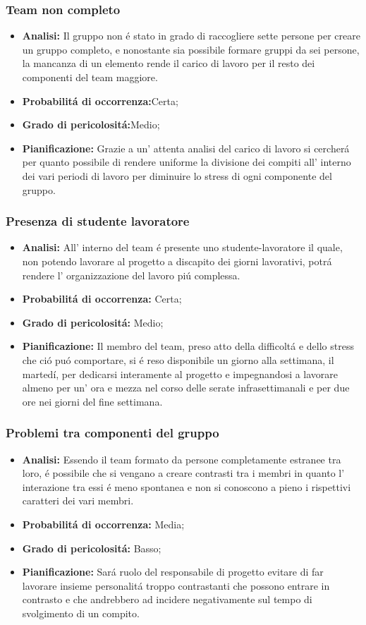 \subsubsection{Team non completo}
	\begin{itemize}
	\item \textbf{Analisi: }Il gruppo non \'e stato in grado di raccogliere sette persone per creare un gruppo completo, e nonostante sia possibile formare gruppi da sei persone, la mancanza di un elemento rende il carico di lavoro per il resto dei componenti del team maggiore.
	\item \textbf{Probabilit\'a di occorrenza:}Certa;
	\item \textbf{Grado di pericolosit\'a:}Medio;
	\item \textbf{Pianificazione: }Grazie a un' attenta analisi del carico di lavoro si cercher\'a per quanto possibile di rendere uniforme la divisione dei compiti all' interno dei vari periodi di lavoro per diminuire lo stress di ogni componente del gruppo.
	\end{itemize}
\subsubsection{Presenza di studente lavoratore}
	\begin{itemize}
	\item \textbf{Analisi: }All' interno del team \gruppo \'e presente uno studente-lavoratore il quale, non potendo lavorare al progetto a discapito dei giorni lavorativi, potr\'a rendere l' organizzazione del lavoro pi\'u complessa.
	\item \textbf{Probabilit\'a di occorrenza:} Certa;
	\item \textbf{Grado di pericolosit\'a:} Medio;
	\item \textbf{Pianificazione: }Il membro del team, preso atto della difficolt\'a e dello stress che ci\'o pu\'o comportare, si \'e reso disponibile un giorno alla settimana, il marted\'i, per dedicarsi interamente al progetto e impegnandosi a lavorare almeno per un' ora e mezza nel corso delle serate infrasettimanali e per due ore nei giorni del fine settimana.	
	\end{itemize}
\subsubsection{Problemi tra componenti del gruppo}
	\begin{itemize}
	\item \textbf{Analisi: }Essendo il team \gruppo formato da persone completamente estranee tra loro, \'e possibile che si vengano a creare contrasti tra i membri in quanto l' interazione tra essi \'e meno spontanea e non si conoscono a pieno i rispettivi caratteri dei vari membri.
	\item \textbf{Probabilit\'a di occorrenza:} Media;
	\item \textbf{Grado di pericolosit\'a:} Basso;
	\item \textbf{Pianificazione: }Sar\'a ruolo del responsabile di progetto evitare di far lavorare insieme personalit\'a troppo contrastanti che possono entrare in contrasto e che andrebbero ad incidere negativamente sul tempo di svolgimento di un compito.
	\end{itemize}
